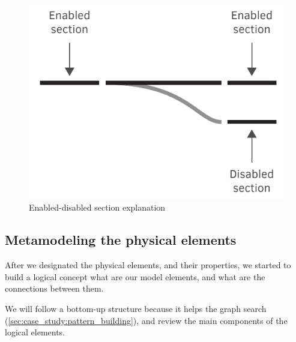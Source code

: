 \begin{figure}[h]
	\centering
	\includegraphics[width=0.5\linewidth]{include/figures/chapter_6/metamodel_switch_endi}
	\caption{Enabled-disabled section explanation}
	\label{fig:case_study:metamodel_switch_endi}
\end{figure}

\subsection{Metamodeling the physical elements}
\label{sec:case_study:logical_breakdown}
After we designated the physical elements, and their properties, we started to build a logical concept what are our model elements, and what are the connections between them.

We will follow a bottom-up structure because it helps the graph search (\cref{sec:case_study:pattern_building}), and review the main components of the logical elements.


